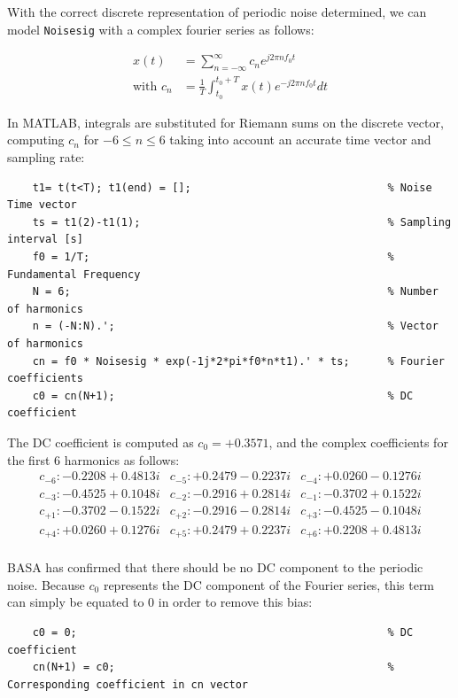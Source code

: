 \documentclass[12pt]{article}
\numberwithin{equation}{section}
\numberwithin{figure}{section}
\numberwithin{table}{section}
\begin{document}
With the correct discrete representation of periodic noise determined, we can
model \verb+Noisesig+ with a complex fourier series as follows:

\begin{align*}
    x(t)             & = \sum_{n=-\infty}^{\infty} c_n e^{j 2\pi n f_0 t}          \\
    \text{with } c_n & = \frac{1}{T} \int^{t_0 + T}_{t_0} x(t)e^{-j2\pi nf_0 t} dt
\end{align*}

In MATLAB, integrals are substituted for Riemann sums on the discrete vector,
computing $c_n$ for $-6\le n \le 6$ taking into account an accurate time vector
and sampling rate:

\begin{verbatim}
    t1= t(t<T); t1(end) = [];                               % Noise Time vector 
    ts = t1(2)-t1(1);                                       % Sampling interval [s]
    f0 = 1/T;                                               % Fundamental Frequency
    N = 6;                                                  % Number of harmonics
    n = (-N:N).';                                           % Vector of harmonics
    cn = f0 * Noisesig * exp(-1j*2*pi*f0*n*t1).' * ts;      % Fourier coefficients
    c0 = cn(N+1);                                           % DC coefficient
\end{verbatim}

The DC coefficient is computed as $c_0 = +0.3571$, and the complex coefficients
for the first 6 harmonics as follows:
\[
    \begin{array}{ccc}
        c_{-6} : -0.2208 + 0.4813i & c_{-5} : +0.2479 - 0.2237i & c_{-4} : +0.0260 - 0.1276i \\
        c_{-3} : -0.4525 + 0.1048i & c_{-2} : -0.2916 + 0.2814i & c_{-1} : -0.3702 + 0.1522i \\
        c_{+1} : -0.3702 - 0.1522i & c_{+2} : -0.2916 - 0.2814i & c_{+3} : -0.4525 - 0.1048i \\
        c_{+4} : +0.0260 + 0.1276i & c_{+5} : +0.2479 + 0.2237i & c_{+6} : +0.2208 + 0.4813i \\
    \end{array}
\]

BASA has confirmed that there should be no DC component to the periodic noise.
Because $c_0$ represents the DC component of the Fourier series, this term can
simply be equated to 0 in order to remove this bias:

\begin{verbatim}
    c0 = 0;                                                 % DC coefficient
    cn(N+1) = c0;                                           % Corresponding coefficient in cn vector 
\end{verbatim}
\end{document}
